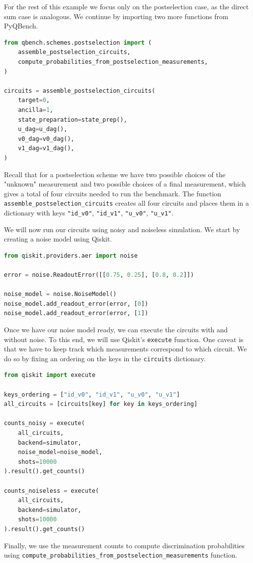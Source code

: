 \documentclass[preprint,12pt, a4paper, dvipsnames]{elsarticle}
\newcommand{\1}{{\rm 1\hspace{-0.9mm}l}}
\theoremstyle{definition}
\begin{document}
\pagebreak

For the rest of this example we focus only on the postselection case, as the direct sum case is
analogous. We continue by importing two more functions from PyQBench.
\begin{lstlisting}[language=Python, caption= Assembling circuits]
from qbench.schemes.postselection import (
    assemble_postselection_circuits,
    compute_probabilities_from_postselection_measurements,
)

circuits = assemble_postselection_circuits(
	target=0,
	ancilla=1,
	state_preparation=state_prep(),
	u_dag=u_dag(),
	v0_dag=v0_dag(),
	v1_dag=v1_dag(),
)

\end{lstlisting}
Recall that for a postselection scheme we have two possible choices of the "unknown" measurement and
two possible choices of a final measurement, which gives a total of four circuits needed to run the
benchmark. The function \texttt{assemble\_postselection\_circuits} creates all four circuits and
places them in a dictionary with keys \texttt{"id\_v0"}, \texttt{"id\_v1"}, \texttt{"u\_v0"},
\texttt{"u\_v1"}.

We will now run our circuits using noisy and noiseless simulation. We start by creating a noise
model using Qiskit.


\begin{lstlisting}[language=Python, caption=Adding noise model]
from qiskit.providers.aer import noise

error = noise.ReadoutError([[0.75, 0.25], [0.8, 0.2]])

noise_model = noise.NoiseModel()
noise_model.add_readout_error(error, [0])
noise_model.add_readout_error(error, [1])
\end{lstlisting}
Once we have our noise model ready, we can execute the circuits with and without noise. To this end,
we will use Qiskit’s \texttt{execute} function. One caveat is that we have to keep track which
measurements correspond to which circuit. We do so by fixing an ordering on the keys in the \texttt{circuits} dictionary.
\begin{lstlisting}[language=Python, caption=Running  circuits]
from qiskit import execute

keys_ordering = ["id_v0", "id_v1", "u_v0", "u_v1"]
all_circuits = [circuits[key] for key in keys_ordering]

counts_noisy = execute(
	all_circuits,
	backend=simulator,
	noise_model=noise_model,
	shots=10000
).result().get_counts()

counts_noiseless = execute(
	all_circuits,
	backend=simulator,
	shots=10000
).result().get_counts()
\end{lstlisting}
Finally, we use the measurement counts to compute discrimination probabilities using \texttt{compute\_probabilities\_from\_postselection\_measurements} function.
\end{document}
